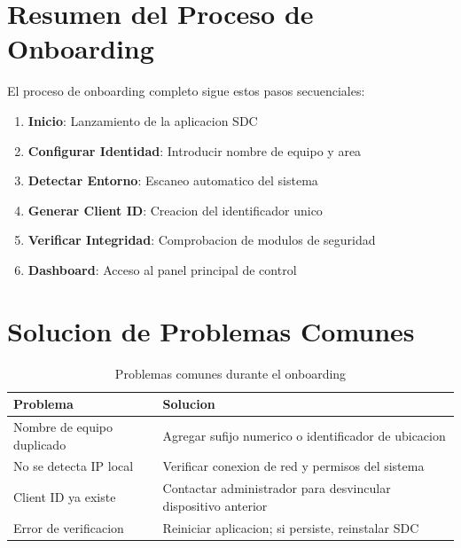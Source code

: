 \section{Resumen del Proceso de Onboarding}

El proceso de onboarding completo sigue estos pasos secuenciales:

\begin{enumerate}
    \item \textbf{Inicio}: Lanzamiento de la aplicacion SDC
    \item \textbf{Configurar Identidad}: Introducir nombre de equipo y area
    \item \textbf{Detectar Entorno}: Escaneo automatico del sistema
    \item \textbf{Generar Client ID}: Creacion del identificador unico
    \item \textbf{Verificar Integridad}: Comprobacion de modulos de seguridad
    \item \textbf{Dashboard}: Acceso al panel principal de control
\end{enumerate}

\section{Solucion de Problemas Comunes}

\begin{table}[H]
\centering
\begin{tabular}{p{5cm}p{8cm}}
\toprule
\textbf{Problema} & \textbf{Solucion} \\
\midrule
Nombre de equipo duplicado & Agregar sufijo numerico o identificador de ubicacion \\
No se detecta IP local & Verificar conexion de red y permisos del sistema \\
Client ID ya existe & Contactar administrador para desvincular dispositivo anterior \\
Error de verificacion & Reiniciar aplicacion; si persiste, reinstalar SDC \\
\bottomrule
\end{tabular}
\caption{Problemas comunes durante el onboarding}
\label{tab:problemas-onboarding}
\end{table}
